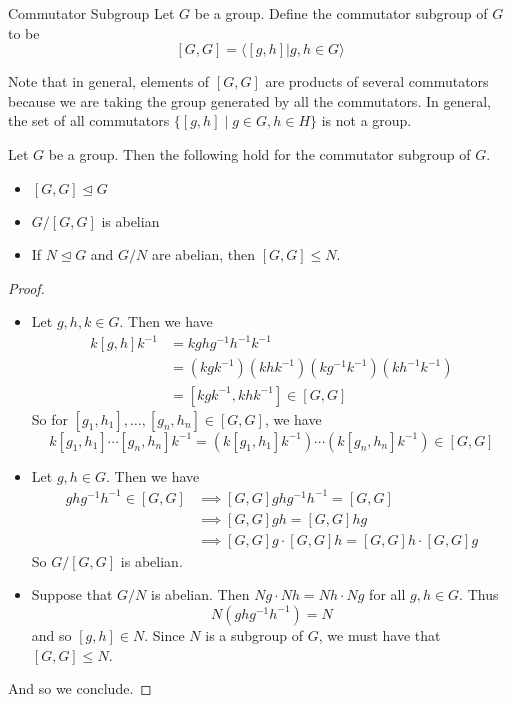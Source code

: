 \documentclass[a4paper]{article}
\begin{document}
\begin{defn}{Commutator Subgroup}{} Let $G$ be a group. Define the commutator subgroup of $G$ to be $$[G,G]=\langle [g,h]|g,h\in G\rangle$$
\end{defn}

Note that in general, elements of $[G,G]$ are products of several commutators because we are taking the group generated by all the commutators. In general, the set of all commutators $\{[g,h]\;|\;g\in G, h\in H\}$ is not a group. 

\begin{prp}{}{} Let $G$ be a group. Then the following hold for the commutator subgroup of $G$. 
\begin{itemize}
\item $[G,G]\trianglelefteq G$
\item $G/[G,G]$ is abelian
\item If $N\trianglelefteq G$ and $G/N$ are abelian, then $[G,G]\leq N$. 
\end{itemize} \tcbline
\begin{proof}~\\
\begin{itemize}
\item Let $g,h,k\in G$. Then we have 
\begin{align*}
k[g,h]k^{-1}&=kghg^{-1}h^{-1}k^{-1}\\
&=\left(kgk^{-1}\right)\left(khk^{-1}\right)\left(kg^{-1}k^{-1}\right)\left(kh^{-1}k^{-1}\right)\\
&=[kgk^{-1},khk^{-1}]\in[G,G]
\end{align*}
So for $[g_1,h_1],\dots,[g_n,h_n]\in[G,G]$, we have $$k[g_1,h_1]\cdots[g_n,h_n]k^{-1}=\left(k[g_1,h_1]k^{-1}\right)\cdots\left(k[g_n,h_n]k^{-1}\right)\in[G,G]$$
\item Let $g,h\in G$. Then we have 
\begin{align*}
ghg^{-1}h^{-1}\in[G,G]&\implies [G,G]ghg^{-1}h^{-1}=[G,G]\\
&\implies [G,G]gh=[G,G]hg\\
&\implies [G,G]g\cdot[G,G]h=[G,G]h\cdot[G,G]g
\end{align*}
So $G/[G,G]$ is abelian. 
\item Suppose that $G/N$ is abelian. Then $Ng\cdot Nh=Nh\cdot Ng$ for all $g,h\in G$. Thus $$N(ghg^{-1}h^{-1})=N$$ and so $[g,h]\in N$. Since $N$ is a subgroup of $G$, we must have that $[G,G]\leq N$. 
\end{itemize}
And so we conclude. 
\end{proof}
\end{prp}
\end{document}
